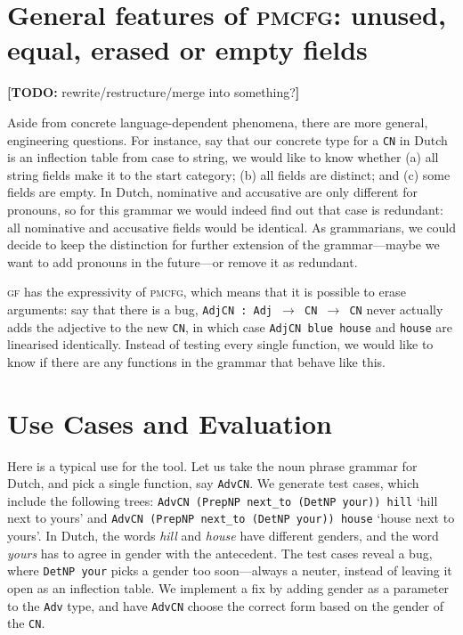 \documentclass[11pt]{article}
\def\t#1{\texttt{#1}}
\def\gf{\textsc{gf}}
\def\pmcfg{\textsc{pmcfg}}
\newcommand{\todo}[1]{{\color{cyan}\textbf{[TODO: }#1\textbf{]}}}
\begin{document}
\section{General features of \pmcfg: unused, equal,
  erased or empty fields}

\todo{rewrite/restructure/merge into something?}

Aside from concrete language-dependent phenomena, there are more
general, engineering questions. For instance, say that our
concrete type for a \t{CN} in Dutch is an inflection table from case
to string, we would like to know whether (a) all string fields make it to
the start category; (b) all fields are distinct; and (c) some fields
are empty. In Dutch, nominative and accusative are only different for
pronouns, so for this grammar we would indeed find out that case is
redundant: all nominative and accusative fields would be
identical. As grammarians, we could decide to keep the distinction for
further extension of the grammar---maybe we want to add pronouns in
the future---or remove it as redundant.

\gf{} has the expressivity of \pmcfg{}, which means that it is
possible to erase arguments: say that there is a bug, \t{AdjCN : Adj
  $\rightarrow$ CN  $\rightarrow$ CN} never actually adds the
adjective to the new \t{CN}, in which case \t{AdjCN blue house} and
\t{house} are linearised identically. Instead of testing every single
function, we would like to know if there are any functions in the
grammar that behave like this.

\section{Use Cases and Evaluation}

Here is a typical use for the tool. 
Let us take the noun phrase grammar for Dutch, and pick a single function,
say \t{AdvCN}. We generate test cases, which include the following
trees: \t{AdvCN (PrepNP next\_to (DetNP your)) hill} `hill next to
yours' and \t{AdvCN (PrepNP next\_to (DetNP your)) house} `house next
to yours'. In Dutch, the words \emph{hill} and \emph{house} have
different genders, and the word \emph{yours} has to agree in gender
with the antecedent. The test cases reveal a bug, where \t{DetNP your}
picks a gender too soon---always a neuter, instead of leaving it open
as an inflection table. We implement a fix by adding gender as a
parameter to the \t{Adv} type, and have \t{AdvCN} choose the correct
form based on the gender of the \t{CN}. 
\end{document}
